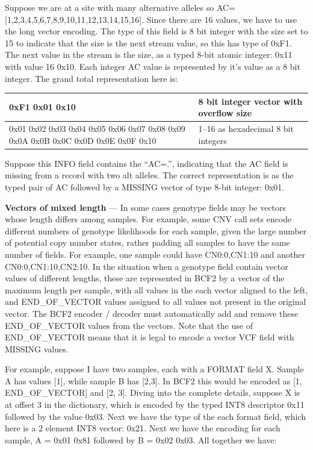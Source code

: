 \documentclass[8pt]{article}
\begin{document}
Suppose we are at a site with many alternative alleles so AC=[1,2,3,4,5,6,7,8,9,10,11,12,13,14,15,16].
Since there are 16 values, we have to use the long vector encoding.
The type of this field is 8 bit integer with the size set to 15 to indicate that the size is the next stream value, so this has type of 0xF1.
The next value in the stream is the size, as a typed 8-bit atomic integer: 0x11 with value 16 0x10.
Each integer AC value is represented by it's value as a 8 bit integer.
The grand total representation here is:

\vspace{0.3cm}
\begin{tabular}{|p{9cm} | p{6cm}|} \hline
0xF1 0x01 0x10 & 8 bit integer vector with overflow size \\ \hline
0x01 0x02 0x03 0x04 0x05 0x06 0x07 0x08 0x09 0x0A 0x0B 0x0C 0x0D 0x0E 0x0F 0x10 & 1--16 as hexadecimal 8 bit integers \\ \hline
\end{tabular}
\vspace{0.3cm}

Suppose this INFO field contains the ``AC=.'', indicating that the AC field is missing from a record with two alt alleles.
The correct representation is as the typed pair of AC followed by a MISSING vector of type 8-bit integer: 0x01.

\vspace{0.3cm}
\textbf{Vectors of mixed length} --- In some cases genotype fields may be vectors whose length differs among samples.  
For example, some CNV call sets encode different numbers of genotype likelihoods for each sample, given the large number of potential copy number states, rather padding all samples to have the same number of fields.  
For example, one sample could have CN0:0,CN1:10 and another CN0:0,CN1:10,CN2:10.  
In the situation when a genotype field contain vector values of different lengths, these are represented in BCF2 by a vector of the maximum length per sample, with all values in the each vector aligned to the left, and END\_OF\_VECTOR values assigned to all values not present in the original vector.  
The BCF2 encoder / decoder must automatically add and remove these END\_OF\_VECTOR values from the vectors. Note that the use of END\_OF\_VECTOR means that it is legal to encode a vector VCF field with MISSING values.

For example, suppose I have two samples, each with a FORMAT field X.  
Sample A has values [1], while sample B has [2,3].  
In BCF2 this would be encoded as [1, END\_OF\_VECTOR] and [2, 3]. 
Diving into the complete details, suppose X is at offset 3 in the dictionary, which is encoded by the typed INT8 descriptor 0x11 followed by the value 0x03. 
Next we have the type of the each format field, which here is a 2 element INT8 vector: 0x21.  
Next we have the encoding for each sample, A = 0x01 0x81 followed by B = 0x02 0x03.  
All together we have:
\end{document}
